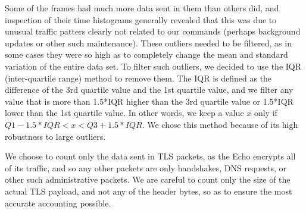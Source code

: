 Some of the frames had much more data sent in them than others did, and inspection of their time histograms generally revealed that this was due to unusual traffic patters clearly not related to our commands (perhaps background updates or other such maintenance). These outliers needed to be filtered, as in some cases they were so high as to completely change the mean and standard variation of the entire data set. To filter such outliers, we decided to use the IQR (inter-quartile range) method to remove them. The IQR is defined as the difference of the 3rd quartile value and the 1st quartile value, and we filter any value that is more than 1.5*IQR higher than the 3rd quartile value or 1.5*IQR lower than the 1st quartile value. In other words, we keep a value $x$ only if $Q1 - 1.5*IQR < x < Q3 + 1.5*IQR$. We chose this method because of its high robustness to large outliers.

We choose to count only the data sent in TLS packets, as the Echo encrypts all of its traffic, and so any other packets are only handshakes, DNS requests, or other such administrative packets. We are careful to count only the size of the actual TLS payload, and not any of the header bytes, so as to ensure the most accurate accounting possible.



